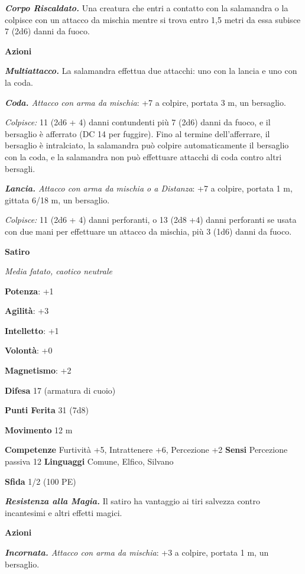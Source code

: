 \begin{multicols}{2}
\emph{\textbf{Corpo Riscaldato.}} Una creatura che entri a contatto con
la salamandra o la colpisce con un attacco da mischia mentre si trova
entro 1,5 metri da essa subisce 7 (2d6) danni da fuoco.

\smallskip\textbf{Azioni}

\emph{\textbf{Multiattacco.}} La salamandra effettua due attacchi: uno
con la lancia e uno con la coda.

\emph{\textbf{Coda.} Attacco con arma da mischia}: +7 a colpire, portata
3 m, un bersaglio.

\emph{Colpisce:} 11 (2d6 + 4) danni contundenti più 7 (2d6) danni da
fuoco, e il bersaglio è afferrato (DC 14 per fuggire). Fino al termine
dell'afferrare, il bersaglio è intralciato, la salamandra può colpire
automaticamente il bersaglio con la coda, e la salamandra non può
effettuare attacchi di coda contro altri bersagli.

\emph{\textbf{Lancia.} Attacco con arma da mischia o a Distanza}: +7 a
colpire, portata 1 m, gittata 6/18 m, un bersaglio.

\emph{Colpisce:} 11 (2d6 + 4) danni perforanti, o 13 (2d8 +4) danni
perforanti se usata con due mani per effettuare un attacco da mischia,
più 3 (1d6) danni da fuoco.



\textbf{Satiro}

\emph{Media fatato, caotico neutrale}

\textbf{Potenza}: +1

\textbf{Agilità}: +3

\textbf{Intelletto}: +1

\textbf{Volontà}: +0

\textbf{Magnetismo}: +2

\textbf{Difesa} 17 (armatura di cuoio)

\textbf{Punti Ferita} 31 (7d8)

\textbf{Movimento} 12 m

\textbf{Competenze} Furtività +5, Intrattenere +6, Percezione +2
\textbf{Sensi} Percezione passiva 12 \textbf{Linguaggi} Comune, Elfico,
Silvano

\textbf{Sfida} 1/2 (100 PE)\smallskip

\emph{\textbf{Resistenza alla Magia.}} Il satiro ha vantaggio ai tiri
salvezza contro incantesimi e altri effetti magici.

\smallskip\textbf{Azioni}

\emph{\textbf{Incornata.} Attacco con arma da mischia}: +3 a colpire,
portata 1 m, un bersaglio.


\end{multicols}
